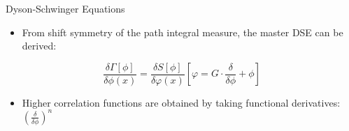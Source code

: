 \begin{frame}{Dyson-Schwinger Equations}
\begin{itemize}
	\item From \alert{shift symmetry} of the path integral measure, the \alert{master DSE} can be derived:
\end{itemize}
\begin{equation}
\frac{\delta \Gamma[\phi]}{\delta \phi(x)}=\frac{\delta S[\phi]}{\delta \varphi(x)}\left[\varphi=G \cdot \frac{\delta}{\delta \phi}+\phi\right] \label{eqn:DSE}
\end{equation}
\begin{itemize}
	\item Higher correlation functions are obtained by taking functional derivatives: $\left(\frac{\delta}{\delta\phi}\right)^n$
\end{itemize}
\begin{figure}[t]
	\centering
	\begin{align*}

\end{align*}
\end{figure}
\end{frame}
